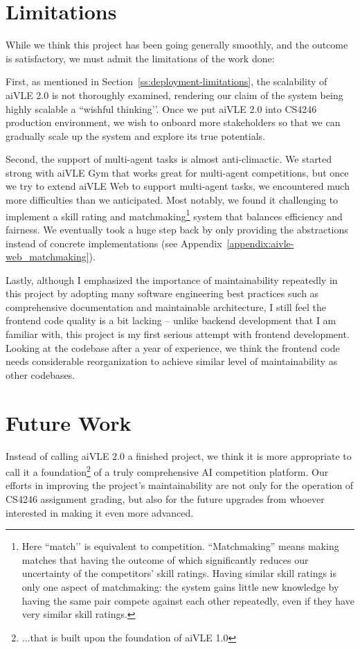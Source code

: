 \section{Limitations}
\label{s:conclusion-limitations}
While we think this project has been going generally smoothly, and the outcome is satisfactory, we must admit the limitations of the work done:

First, as mentioned in Section~\ref{ss:deployment-limitations}, the scalability of aiVLE 2.0 is not thoroughly examined, rendering our claim of the system being highly scalable a ``wishful thinking’’. Once we put aiVLE 2.0 into CS4246 production environment, we wish to onboard more stakeholders so that we can gradually scale up the system and explore its true potentials.

Second, the support of multi-agent tasks is almost anti-climactic. We started strong with aiVLE Gym that works great for multi-agent competitions, but once we try to extend aiVLE Web to support multi-agent tasks, we encountered much more difficulties than we anticipated. Most notably, we found it challenging to implement a skill rating and matchmaking\footnote{Here ``match’’ is equivalent to competition. ``Matchmaking'' means making matches that having the outcome of which significantly reduces our uncertainty of the competitors' skill ratings. Having similar skill ratings is only one aspect of matchmaking: the system gains little new knowledge by having the same pair compete against each other repeatedly, even if they have very similar skill ratings.} system that balances efficiency and fairness. We eventually took a huge step back by only providing the abstractions instead of concrete implementations (see Appendix~\ref{appendix:aivle-web_matchmaking}).

Lastly, although I emphasized the importance of maintainability repeatedly in this project by adopting many software engineering best practices such as comprehensive documentation and maintainable architecture, I still feel the frontend code quality is a bit lacking – unlike backend development that I am familiar with, this project is my first serious attempt with frontend development. Looking at the codebase after a year of experience, we think the frontend code needs considerable reorganization to achieve similar level of maintainability as other codebases.

\section{Future Work}
\label{s:conclusion-future_work}
Instead of calling aiVLE 2.0 a finished project, we think it is more appropriate to call it a foundation\footnote{...that is built upon the foundation of aiVLE 1.0} of a truly comprehensive AI competition platform. Our efforts in improving the project's maintainability are not only for the operation of CS4246 assignment grading, but also for the future upgrades from whoever interested in making it even more advanced.

